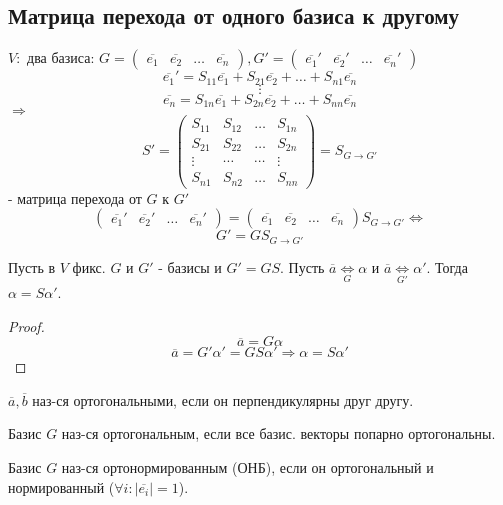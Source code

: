 \subsection{Матрица перехода от одного базиса к другому}
$V\colon $ два базиса: $G = \begin{pmatrix}\overline{e_1} & \overline{e_2} & \ldots & \overline{e_n} \end{pmatrix}, G' = \begin{pmatrix}\overline{e_1}' & \overline{e_2}' & \ldots & \overline{e_n}' \end{pmatrix}$
\[
    \overline{e_1}' = S_{11} \overline{e_1} + S_{21} \overline{e_2} + \ldots + S_{n1} \overline{e_n}
\] 
\[
\vdots 
\] 
\[
\overline{e_n} = S_{1n} \overline{e_1} + S_{2n} \overline{e_2} + \ldots + S_{nn} \overline{e_n}
\] 
$\Rightarrow$
\[
    S' = \begin{pmatrix}S_{11} & S_{12} & \ldots & S_{1n} \\
    S_{21} & S_{22} & \ldots & S_{2n} \\
\vdots  & \cdots & \cdots  & \vdots \\
S_{n1} & S_{n2} & \ldots & S_{nn}\end{pmatrix} = S_{G \to G'}
\] - матрица перехода от $G$ к $G'$ 
\[
    \begin{pmatrix}\overline{e_1}' & \overline{e_2}' & \ldots & \overline{e_n}' \end{pmatrix} = \begin{pmatrix}\overline{e_1} & \overline{e_2} & \ldots & \overline{e_n} \end{pmatrix} S_{G\to G'} \iff
\] 
\[
G' = GS_{G\to G'}
\] 
\begin{statement}
Пусть в $V$ фикс. $G$ и $G'$ - базисы и $G' = GS$. Пусть $\overline{a} \underset{G}{\Longleftrightarrow} \alpha$ и $\overline{a} \underset{G'}{\Longleftrightarrow} \alpha'$. Тогда $\alpha = S \alpha'$.
\end{statement}
\begin{proof}
\[
\overline{a} = G \alpha
\] 
\[
\overline{a} = G' \alpha' = GS \alpha' \Rightarrow \alpha = S\alpha'
\] 
\end{proof}
\begin{definition}
$\overline{a}, \overline{b}$ наз-ся ортогональными, если он перпендикулярны друг другу.
\end{definition}
\begin{definition}
 Базис $G$ наз-ся ортогональным, если все базис. векторы попарно ортогональны.
\end{definition}
\begin{definition}
Базис $G$ наз-ся ортонормированным (ОНБ), если он ортогональный и нормированный ($\forall i \colon |\overline{e_i}| = 1$).
\end{definition}
